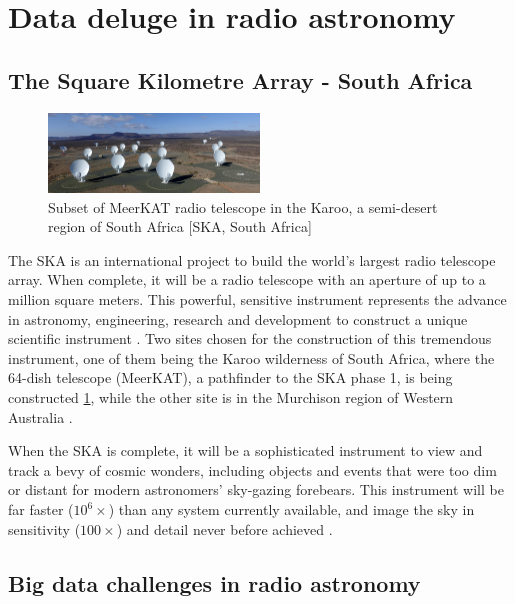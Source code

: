 
\section{Data deluge in radio astronomy}
\subsection{The Square Kilometre Array - South Africa}

\begin{figure}[H]
  \centering
    \includegraphics[width=0.5\textwidth]{images/MeerMeer.jpg}
    \caption{Subset of MeerKAT radio telescope in the Karoo, a semi-desert region of South Africa [SKA, South Africa]}
  \label{images/MeerKAT}
\end{figure}

The SKA is an international project to build the world's largest radio telescope array. When complete, it will be a radio telescope with an aperture of up to a million square meters. This powerful, sensitive instrument represents the advance in astronomy, engineering, research and  development to construct a unique scientific instrument \citep{skatelescope}. Two sites chosen for the construction of this tremendous instrument, one of them being the Karoo wilderness of South Africa, where the 64-dish telescope (MeerKAT), a pathfinder to the SKA phase 1, is being constructed \ref{images/MeerKAT}, while the other site is in the Murchison region of Western Australia \citep{hall2008square}.  

When the SKA is complete, it will be a sophisticated instrument to view and track a bevy of cosmic wonders, including objects and events that were too dim or distant for modern astronomers' sky-gazing forebears. This instrument will be far faster ($10^6\times$) than any system currently available, and image the sky in sensitivity ($100\times$) and detail never before achieved \citep{skatelescope}.

\subsection{Big data challenges in radio astronomy}

